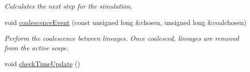 \begin{DoxyCompactItemize}
\begin{DoxyCompactList}\small\item\em Calculates the next step for the simulation. \end{DoxyCompactList}\item 
void \hyperlink{class_tree_a16eedb70009e7570d933f88e8ce44117}{coalescence\+Event} (const unsigned long \&chosen, unsigned long \&coalchosen)
\begin{DoxyCompactList}\small\item\em Perform the coalescence between lineages. Once coalesced, lineages are removed from the active scope. \end{DoxyCompactList}\item 
void \hyperlink{class_tree_afcbe72c55b38c94ae17de9c2e1dd3a7f}{check\+Time\+Update} ()\hypertarget{class_tree_afcbe72c55b38c94ae17de9c2e1dd3a7f}{}\label{class_tree_afcbe72c55b38c94ae17de9c2e1dd3a7f}


\end{DoxyCompactItemize}
